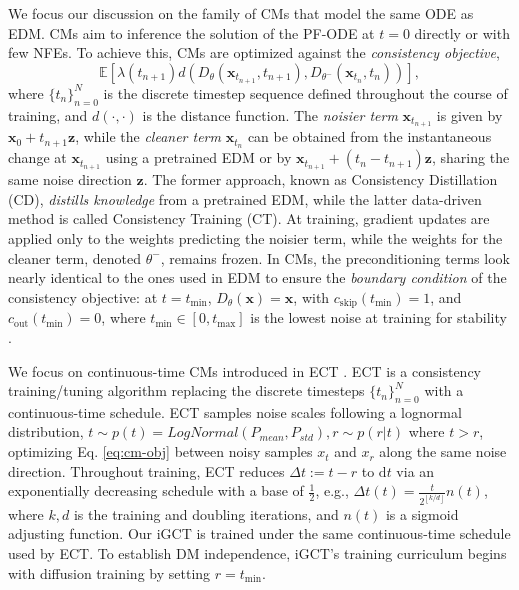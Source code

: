 \label{p:discreteCM}We focus our discussion on the family of CMs that model the same ODE as EDM. CMs aim to inference the solution of the PF-ODE at \(t=0\) directly or with few NFEs. To achieve this, CMs are optimized against the \textit{consistency objective},
\begin{equation}
    \mathbb{E}[\lambda(t_{n+1})d(D_{\theta}(\boldsymbol{x}_{t_{n+1}},t_{n+1}),D_{{\theta}^{-}}( \boldsymbol{x}_{t_{n}},t_{n}))],
    \label{eq:cm-obj}
\end{equation}
where \(\{ t_n \}_{n=0}^{N}\) is the discrete timestep sequence defined throughout the course of training, and \(d(\boldsymbol{\cdot},\boldsymbol{\cdot})\) is the distance function. The \textit{noisier term} \(\boldsymbol{x}_{t_{n+1}}\) is given by \(\boldsymbol{x}_0 + t_{n+1} \boldsymbol{z}\), while the \textit{cleaner term} \(\boldsymbol{x}_{t_n}\) can be obtained from the instantaneous change at \(\boldsymbol{x}_{t_{n+1}}\) using a pretrained EDM or by \(\boldsymbol{x}_{t_{n+1}} + (t_n - t_{n+1}) \boldsymbol{z}\), sharing the same noise direction \(\boldsymbol{z}\). The former approach, known as Consistency Distillation (CD), \textit{distills knowledge} from a pretrained EDM, while the latter data-driven method is called Consistency Training (CT). At training, gradient updates are applied only to the weights predicting the noisier term, while the weights for the cleaner term, denoted \(\theta^-\), remains frozen. In CMs, the preconditioning terms look nearly identical to the ones used in EDM to ensure the \textit{boundary condition} of the consistency objective: at \(t=t_\text{min}\), \(D_{\theta}(\boldsymbol{x}) = \boldsymbol{x}\), with \(c_{\text{skip}}(t_\text{min}) = 1\), and \(c_{\text{out}}(t_\text{min}) = 0\), where \(t_\text{min} \in [0,t_\text{max}]\) is the lowest noise at training for stability \cite{song2023consistency}.

 We focus on continuous-time CMs introduced in ECT \cite{ect}. ECT is a consistency training/tuning algorithm replacing the discrete timesteps \(\{ t_n \}_{n=0}^{N}\) with a continuous-time schedule. ECT samples noise scales following a lognormal distribution, \(t \sim p(t) = \textit{LogNormal}(P_\textit{mean}, P_\textit{std}), r \sim p(r|t)\) where \(t > r\), optimizing Eq. \ref{eq:cm-obj} between noisy samples \(x_t\) and \(x_r\) along the same noise direction. Throughout training, ECT reduces \(\Delta t:=t-r\) to \(\text{d}t\) via an exponentially decreasing schedule with a base of \(\frac{1}{2}\), e.g., \(\Delta t (t)=\frac{t}{2^{\left\lfloor k/d \right\rfloor}}n(t)\), where \(k, d\) is the training and doubling iterations, and \(n(t)\) is a sigmoid adjusting function. Our iGCT is trained under the same continuous-time schedule used by ECT. To establish DM independence, iGCT's training curriculum begins with diffusion training by setting \(r=t_\text{min}\).

